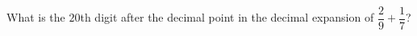 What is the $20$th digit after the decimal point in the decimal expansion of $\dfrac{2}{9}+\dfrac{1}{7}$?
